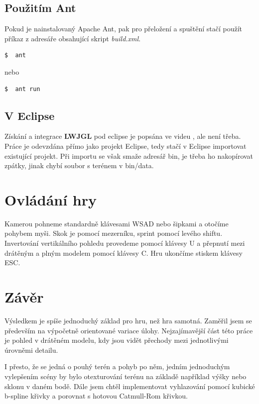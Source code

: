 \documentclass{zcu_sp}
\begin{document}
\subsection{Použitím Ant}
Pokud je nainstalovaný Apache Ant, pak pro přeložení a spuštění stačí použít příkaz z adresáře obsahující skript \textit{build.xml}.
\begin{verbatim}
$  ant
\end{verbatim}
nebo 
\begin{verbatim}
$  ant run
\end{verbatim}

\subsection{V Eclipse}
Získání a integrace \textbf {LWJGL} pod eclipse je popsána ve videu
\cite{installtut}, ale není třeba. Práce je odevzdána přímo jako projekt
Eclipse, tedy stačí v Eclipse importovat existující projekt. Při importu se
však smaže adresář bin, je třeba ho nakopírovat zpátky, jinak chybí soubor s
terénem v bin/data.

\section{Ovládání hry}
Kamerou pohneme standardně klávesami WSAD nebo šipkami a otočíme pohybem myši.
Skok je pomocí mezerníku, sprint pomocí levého shiftu. Invertování vertikálního
pohledu provedeme pomocí klávesy U a přepnutí mezi drátěným a plným modelem
pomocí klávesy C. Hru ukončíme stiskem klávesy ESC.

\section{Závěr}
Výsledkem je spíše jednoduchý základ pro hru, než hra samotná. Zaměřil jsem se
především na výpočetně orientované variace úlohy. Nejzajímavější část této
práce je pohled v drátěném modelu, kdy jsou vidět přechody mezi jednotlivými
úrovněmi detailu.

I přesto, že se jedná o pouhý terén a pohyb po něm, jedním jednoduchým
vylepšením scény by bylo otexturování terénu na základě například výšky nebo
sklonu v daném bodě.  Dále jsem chtěl implementovat vyhlazování pomocí kubické
b-spline křivky a porovnat s hotovou Catmull-Rom křivkou. 
\end{document}
